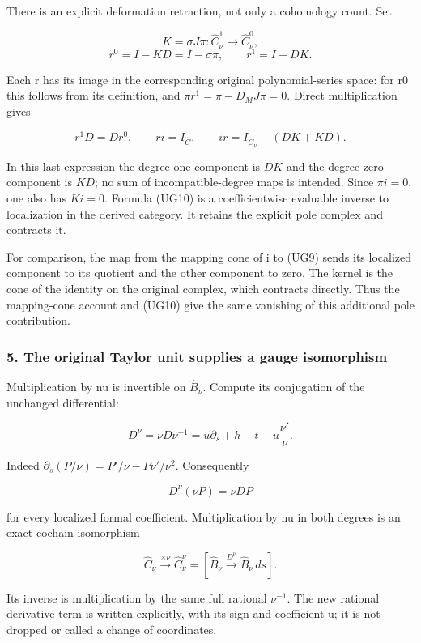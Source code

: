 There is an explicit deformation retraction, not only a cohomology count. Set

\[
K=\sigma J\pi:\widehat C_\nu^1\longrightarrow\widehat C_\nu^0,
\] \[
r^0=I-KD=I-\sigma\pi,\qquad r^1=I-DK.
\tag{UG10}
\]

Each r has its image in the corresponding original polynomial-series space: for r0 this follows from its definition, and \(\pi r^1=\pi-D_M J\pi=0\). Direct multiplication gives

\[
r^1D=Dr^0,\qquad ri=I_{\widehat C},\qquad
ir=I_{\widehat C_\nu}-(DK+KD).
\tag{UG11}
\]

In this last expression the degree-one component is \(DK\) and the degree-zero component is \(KD\); no sum of incompatible-degree maps is intended. Since \(\pi i=0\), one also has \(Ki=0\). Formula (UG10) is a coefficientwise evaluable inverse to localization in the derived category. It retains the explicit pole complex and contracts it.

For comparison, the map from the mapping cone of i to (UG9) sends its localized component to its quotient and the other component to zero. The kernel is the cone of the identity on the original complex, which contracts directly. Thus the mapping-cone account and (UG10) give the same vanishing of this additional pole contribution.

\subsubsection{5. The original Taylor unit supplies a gauge isomorphism}\label{endpoint-f1_unit_gauge--the-original-taylor-unit-supplies-a-gauge-isomorphism}

Multiplication by nu is invertible on \(\widehat B_\nu\). Compute its conjugation of the unchanged differential:

\[
\boxed{D^{\nu}=\nu D\nu^{-1}
=u\partial_s+h-t-u\frac{\nu'}{\nu}.}
\tag{UG12}
\]

Indeed \(\partial_s(P/\nu)=P'/\nu-P\nu'/\nu^2\). Consequently

\[
D^{\nu}(\nu P)=\nu DP
\]

for every localized formal coefficient. Multiplication by nu in both degrees is an exact cochain isomorphism

\[
\widehat C_\nu\xrightarrow{\times\nu}
\widehat C_\nu^{\nu}
=[\widehat B_\nu\xrightarrow{D^{\nu}}\widehat B_\nu\,ds].
\tag{UG13}
\]

Its inverse is multiplication by the same full rational \(\nu^{-1}\). The new rational derivative term is written explicitly, with its sign and coefficient u; it is not dropped or called a change of coordinates.

